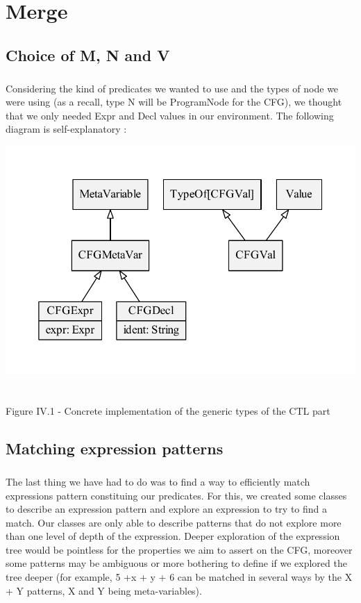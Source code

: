 \documentclass{report}
\begin{document}
\chapter{Merge}

\section{Choice of M, N and V}

\paragraph{}
\hspace{4mm}Considering the kind of predicates we wanted to use and the types of node we were using (as a recall, type N will be ProgramNode for the CFG), we
thought that we only needed Expr and Decl values in our environment. The following diagram is self-explanatory :

\begin{center}
\includegraphics[scale=0.65]{data/merge_types}
~\\~\\Figure IV.1 - Concrete implementation of the generic types of the CTL part
\end{center}

\section{Matching expression patterns}

\paragraph{}
\hspace{4mm}The last thing we have had to do was to find a way to efficiently match expressions pattern
constituing our predicates. For this, we created some classes to describe an expression pattern and explore an expression
to try to find a match. Our classes are only able to describe patterns that do not explore more than one level of depth of the expression.
Deeper exploration of the expression tree would be pointless for the properties we aim to assert on the CFG, moreover
some patterns may be ambiguous or more bothering to define if we explored the tree deeper (for example, 5 +x + y + 6 can be matched in several ways by the X + Y patterns, 
X and Y being meta-variables).
\end{document}
